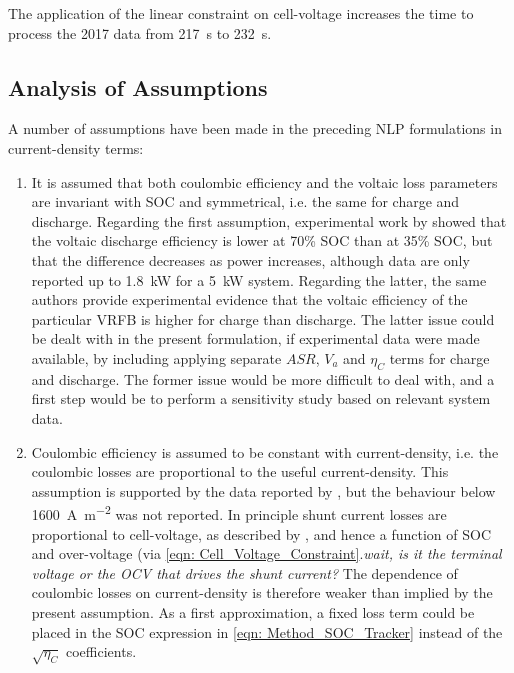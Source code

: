 \documentclass[preprint,3p,review,authoryear,10pt]{elsarticle}
\begin{document}
The application of the linear constraint on cell-voltage increases the time to process the 2017 data from \SI{217}{\second} to \SI{232}{\second}.

\subsection{Analysis of Assumptions}
\label{analysis_of_assumptions}
A number of assumptions have been made in the preceding NLP formulations in current-density terms:

\begin{enumerate}

    \item It is assumed that both coulombic efficiency and the voltaic loss parameters are invariant with SOC and symmetrical, i.e. the same for charge and discharge. Regarding the first assumption, experimental work by \cite{Nguyen2014} showed that the voltaic discharge efficiency is lower at 70\% SOC than at 35\% SOC, but that the difference decreases as power increases, although data are only reported up to \SI{1.8}{\kilo\watt} for a \SI{5}{\kilo\watt} system. Regarding the latter, the same authors provide experimental evidence that the voltaic efficiency of the particular VRFB is higher for charge than discharge. The latter issue could be dealt with in the present formulation, if experimental data were made available, by including applying separate $ASR$, $V_a$ and $\eta_{C}$ terms for charge and discharge. The former issue would be more difficult to deal with, and a first step would be to perform a sensitivity study based on relevant system data.
    
    \item Coulombic efficiency is assumed to be constant with current-density, i.e. the coulombic losses are proportional to the useful current-density. This assumption is supported by the data reported by \cite{Reed2016}, but the behaviour below \SI{1600}{\ampere\per\square\meter} was not reported. In principle shunt current losses are proportional to cell-voltage, as described by \cite{Xing2011}, and hence a function of SOC and over-voltage (via \cref{eqn: Cell_Voltage_Constraint}.\emph{wait, is it the terminal voltage or the OCV that drives the shunt current?} The dependence of coulombic losses on current-density is therefore weaker than implied by the present assumption. As a first approximation, a fixed loss term could be placed in the SOC expression in \cref{eqn: Method_SOC_Tracker} instead of the $\sqrt{\eta_C}$ coefficients.
    

\end{enumerate}
\end{document}
